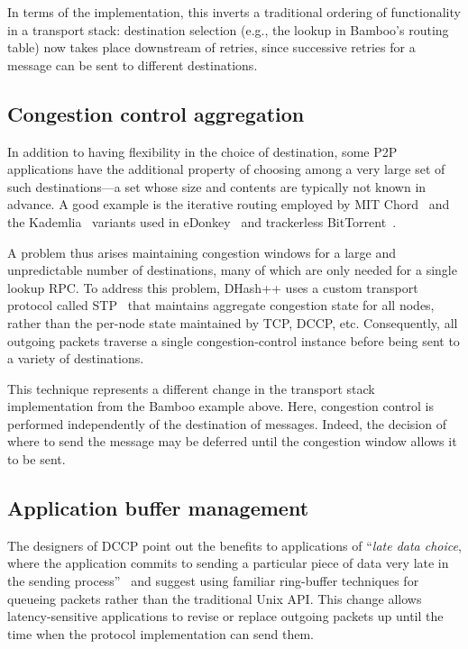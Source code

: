In terms of the implementation, this inverts a
traditional ordering of functionality in a transport stack:
destination selection (e.g., the lookup in Bamboo's routing table)
now takes place downstream of retries, since successive
retries for a message can be sent to different destinations. 

\subsection{Congestion control aggregation}

\label{sec:unpredictableNextHop}
In addition to having flexibility in the choice of destination, some
P2P applications have the additional property of choosing among a very
large set of such destinations---a set whose size and contents are
typically not known in advance.  A good example
is the iterative routing employed by MIT
Chord~\cite{dabek_nsdi04} and the Kademlia~\cite{kademlia} variants used in
eDonkey~\cite{edonkey} and trackerless BitTorrent~\cite{bittorrent-dht}.  

A problem thus arises maintaining congestion windows for a
large and unpredictable number of destinations, many of which are only
needed for a single lookup RPC.  To address this problem,
DHash++ uses a custom transport protocol called
STP~\cite{dabek_nsdi04} that maintains aggregate congestion state for
all nodes, rather than the per-node state maintained by TCP, DCCP, etc. 
Consequently, all outgoing packets traverse a single
congestion-control instance before being sent to a variety of
destinations. 

This technique represents a different change in the
transport stack implementation from the Bamboo example above.  Here,
congestion control is performed independently of the destination of
messages.  Indeed, the decision of where to send the message may be
deferred until the congestion window allows it to be sent. 

\subsection{Application buffer management}
\label{sec:applicationBufferManagement}

The designers of DCCP point out the benefits to applications of
``\emph{late data choice}, where the application commits to sending a
particular piece of data very late in the sending
process''~\cite{dccp-api} and suggest using familiar ring-buffer
techniques for queueing packets rather than the traditional Unix API.
This change allows latency-sensitive applications to revise or replace
outgoing packets up until the time when the protocol
implementation can send them. 


